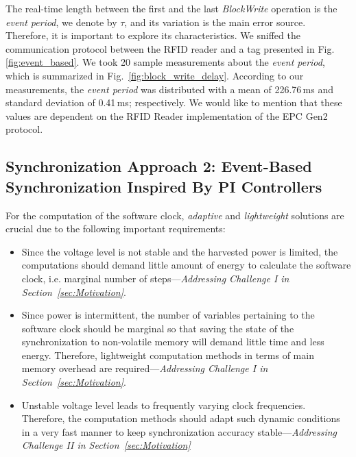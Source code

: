 \documentclass[journal,draftcls,onecolumn,12pt,twoside]{IEEEtranTCOM}
\begin{document}
The real-time length between the first and the last \emph{BlockWrite} operation is the \emph{event period}, we denote by $\tau$, and its variation is the main error source. Therefore, it is important to explore its characteristics. We sniffed the communication protocol between the RFID reader and a tag presented in Fig. \ref{fig:event_based}. We took 20 sample measurements about the \emph{event period}, which is summarized in Fig.~\ref{fig:block_write_delay}. According to our measurements, the \emph{event period} was distributed with a mean of 226.76\,ms and standard deviation of 0.41\,ms; respectively. We would like to mention that these values are dependent on the RFID Reader implementation of the EPC Gen2 protocol.

\subsection{Synchronization Approach 2: Event-Based Synchronization Inspired By PI Controllers }

For the computation of the software clock, \emph{adaptive} and \emph{lightweight} solutions are crucial due to the following important requirements:

\begin{itemize}
\item Since the voltage level is not stable and the harvested power is limited, the computations should demand little amount of energy to calculate the software clock, i.e. marginal number of steps---\emph{Addressing Challenge I in Section~\ref{sec:Motivation}}.

\item Since power is intermittent, the number of variables pertaining to the software clock should be marginal so that saving the state of the synchronization to non-volatile memory will demand little time and less energy. Therefore, lightweight computation methods in terms of main memory overhead are required---\emph{Addressing Challenge I in Section~\ref{sec:Motivation}}.

\item Unstable voltage level leads to frequently varying clock frequencies. Therefore, the computation methods should adapt such dynamic conditions in a very fast manner to keep synchronization accuracy stable---\emph{Addressing Challenge II in Section~\ref{sec:Motivation}}
\end{itemize}
\end{document}
